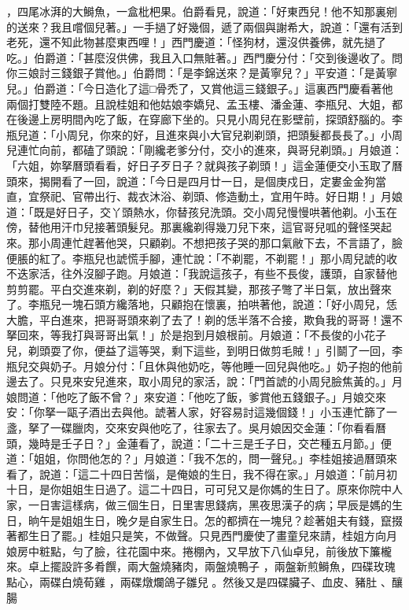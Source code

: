 ，四尾冰湃的大鰣魚，一盒枇杷果。伯爵看見，說道：「好東西兒！他不知那裏剜的送來？我且嚐個兒著。」一手撾了好幾個，遞了兩個與謝希大，說道：「還有活到老死，還不知此物甚麼東西哩！」西門慶道：「怪狗材，還沒供養佛，就先撾了吃。」伯爵道：「甚麼沒供佛，我且入口無賍著。」西門慶分付：「交到後邊收了。問你三娘討三錢銀子賞他。」伯爵問：「是李錦送來？是黃寧兒？」平安道：「是黃寧兒。」伯爵道：「今日造化了這□骨禿了，又賞他這三錢銀子。」這裏西門慶看著他兩個打雙陸不題。且說桂姐和他姑娘李嬌兒、孟玉樓、潘金蓮、李瓶兒、大姐，都在後邊上房明間內吃了飯，在穿廊下坐的。只見小周兒在影壁前，探頭舒腦的。李瓶兒道：「小周兒，你來的好，且進來與小大官兒剃剃頭，把頭髮都長長了。」小周兒連忙向前，都磕了頭說：「剛纔老爹分付，交小的進來，與哥兒剃頭。」月娘道：「六姐，妳拏曆頭看看，好日子歹日子？就與孩子剃頭！」這金蓮便交小玉取了曆頭來，揭開看了一回，說道：「今日是四月廿一日，是個庚戍日，定婁金金狗當直，宜祭祀、官帶出行、裁衣沐浴、剃頭、修造動土，宜用午時。好日期！」月娘道：「既是好日子，交丫頭熱水，你替孩兒洗頭。交小周兒慢慢哄著他剃。小玉在傍，替他用汗巾兒接著頭髮兒。那裏纔剃得幾刀兒下來，這官哥兒呱的聲怪哭起來。那小周連忙趕著他哭，只顧剃。不想把孩子哭的那口氣敝下去，不言語了，臉便脹的紅了。李瓶兒也諕慌手腳，連忙說：「不剃罷，不剃罷！」那小周兒諕的收不迭家活，往外沒腳子跑。月娘道：「我說這孩子，有些不長俊，護頭，自家替他剪剪罷。平白交進來剃，剃的好麼？」天假其變，那孩子彆了半日氣，放出聲來了。李瓶兒一塊石頭方纔落地，只顧抱在懷裏，拍哄著他，說道：「好小周兒，恁大膽，平白進來，把哥哥頭來剃了去了！剃的恁半落不合接，欺負我的哥哥！還不拏回來，等我打與哥哥出氣！」於是抱到月娘根前。月娘道：「不長俊的小花子兒，剃頭耍了你，便益了這等哭，剩下這些，到明日做剪毛賊！」引鬬了一回，李瓶兒交與奶子。月娘分付：「且休與他奶吃，等他睡一回兒與他吃。」奶子抱的他前邊去了。只見來安兒進來，取小周兒的家活，說：「門首諕的小周兒臉焦黃的。」月娘問道：「他吃了飯不曾？」來安道：「他吃了飯，爹賞他五錢銀子。」月娘交來安：「你拏一甌子酒出去與他。諕著人家，好容易討這幾個錢！」小玉連忙篩了一盞，拏了一碟臘肉，交來安與他吃了，往家去了。吳月娘因交金蓮：「你看看曆頭，幾時是壬子日？」金蓮看了，說道：「二十三是壬子日，交芒種五月節。」便道：「姐姐，你問他怎的？」月娘道：「我不怎的，問一聲兒。」李桂姐接過曆頭來看了，說道：「這二十四日苦惱，是俺娘的生日，我不得在家。」月娘道：「前月初十日，是你姐姐生日過了。這二十四日，可可兒又是你媽的生日了。原來你院中人家，一日害這樣病，做三個生日，日里害思錢病，黑夜思漢子的病；早辰是媽的生日，晌午是姐姐生日，晚夕是自家生日。怎的都擠在一塊兒？趁著姐夫有錢，竄掇著都生日了罷。」桂姐只是笑，不做聲。只見西門慶使了畫童兒來請，桂姐方向月娘房中粧點，勻了臉，往花園中來。捲棚內，又早放下八仙卓兒，前後放下簾櫳來。卓上擺設許多肴饌，兩大盤燒豬肉，兩盤燒鴨子 ，兩盤新煎鰣魚，四碟玫瑰點心，兩碟白燒荀雞 ，兩碟燉爛鴿子雛兒 。然後又是四碟臟子、血皮、豬肚 、釀腸 